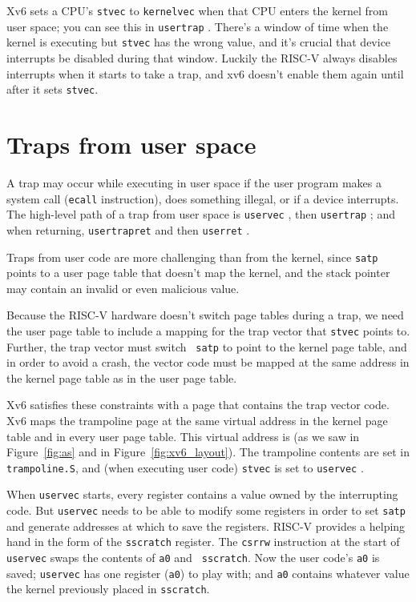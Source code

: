 Xv6 sets a CPU's {\tt stvec} to {\tt kernelvec} when that CPU
enters the kernel from user space; you can see this in {\tt usertrap}
.
There's a window of time when the kernel is executing
but {\tt stvec} has the wrong value, and it's crucial that device
interrupts be disabled during that window.
Luckily the RISC-V always disables interrupts when it starts
to take a trap, and xv6 doesn't enable them again until
after it sets {\tt stvec}.

\section{Traps from user space}

A trap may occur while executing in user space if the
user program makes a
system call ({\tt ecall} instruction), does something
illegal, or if a device interrupts.
The high-level path of a trap from user space is
{\tt uservec}
,
then {\tt usertrap}
;
and when returning,
{\tt usertrapret}
and then
{\tt userret}
.

Traps from user code are more challenging than from the kernel, since
{\tt satp} points to a user page table that doesn't map the 
kernel, and the stack pointer may contain an invalid or even malicious
value.

Because the RISC-V hardware doesn't switch page tables during a trap,
we need the user page table to include a mapping for the trap vector
that {\tt stvec} points to. Further, the trap vector must switch {\tt
  satp} to point to the kernel page table, and in order to avoid a
crash, the vector code must be mapped at the same address in the
kernel page table as in the user page table.

Xv6 satisfies these constraints with a  page
that contains the trap vector code. Xv6 maps the trampoline page at
the same virtual address in the kernel page table and in every user
page table. This virtual address is  (as we saw
in Figure~\ref{fig:as} and in Figure~\ref{fig:xv6_layout}). The
trampoline contents are set in {\tt trampoline.S},
and (when executing user code) {\tt stvec} is set to
{\tt uservec}
.

When {\tt uservec} starts, every register contains a value owned by
the interrupting code. But {\tt uservec} needs to be able to modify
some registers in order to set {\tt satp} and generate addresses at
which to save the registers. RISC-V provides a helping hand in the
form of the {\tt sscratch} register. The {\tt csrrw} instruction at
the start of {\tt uservec} swaps the contents of {\tt a0} and {\tt
  sscratch}. Now the user code's {\tt a0} is saved; {\tt uservec} has
one register ({\tt a0}) to play with; and {\tt a0} contains whatever
value the kernel previously placed in {\tt sscratch}.

